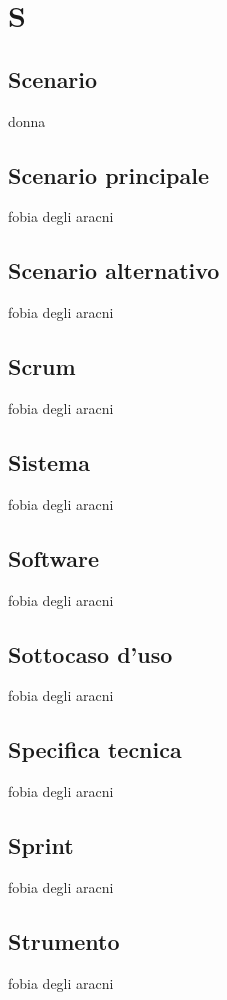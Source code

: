 \section{S} 
\subsection{Scenario} 
donna
\subsection{Scenario principale} 
fobia degli aracni
\subsection{Scenario alternativo} 
fobia degli aracni
\subsection{Scrum} 
fobia degli aracni
\subsection{Sistema} 
fobia degli aracni
\subsection{Software} 
fobia degli aracni
\subsection{Sottocaso d'uso} 
fobia degli aracni
\subsection{Specifica tecnica} 
fobia degli aracni
\subsection{Sprint} 
fobia degli aracni
\subsection{Strumento} 
fobia degli aracni
